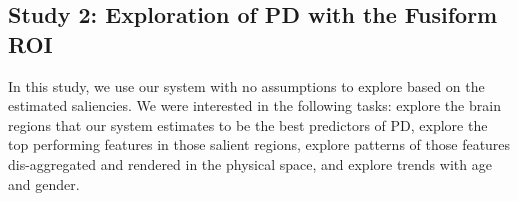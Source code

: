 

\subsection{Study 2: Exploration of PD with the Fusiform ROI}


\noindent In this study, we use our system with no assumptions to explore based on the estimated saliencies. We were interested in the following tasks: explore the brain regions that our system estimates to be the best predictors of PD, %
explore the top performing features in those salient regions, explore patterns of those features dis-aggregated and rendered in the physical space, and explore trends with age and gender.  



